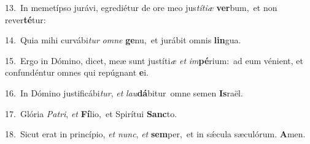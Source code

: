 {\numbfont\textcolor{\numbcolor}{13.}}~In memetípso jurávi, egrediétur de ore meo jus\-\textit{tí}\-\textit{ti}\textit{æ} \textbf{ver}\-bum,~\star et non rever\-\textbf{té}\-tur:\par
{\numbfont\textcolor{\numbcolor}{14.}}~Quia mihi curvábi\textit{tur} \textit{om}\-\textit{ne} \textbf{ge}\-nu,~\star et jurábit omnis \textbf{lin}\-gua.\par
{\numbfont\textcolor{\numbcolor}{15.}}~Ergo in Dómino, dicet, meæ sunt justíti\textit{æ} \textit{et} \textit{im}\-\textbf{pé}rium:~\star ad eum vénient, et confundéntur omnes qui repúgnant \textbf{e}\-i.\par
{\numbfont\textcolor{\numbcolor}{16.}}~In Dómino justificábi\-\textit{tur}\-, \textit{et} \textit{lau}\-\textbf{dá}bitur~\star omne semen \textbf{Is}\-raël.\par
{\numbfont\textcolor{\numbcolor}{17.}}~Glória \textit{Pa}\-\textit{tri}, \textit{et} \textbf{Fí}\-lio,~\star et Spirítui \textbf{Sanc}\-to.\par
{\numbfont\textcolor{\numbcolor}{18.}}~Sicut erat in princípio, \textit{et} \textit{nunc}\-, \textit{et} \textbf{sem}\-per,~\star et in sǽcula sæculórum. \textbf{A}\-men.\par
